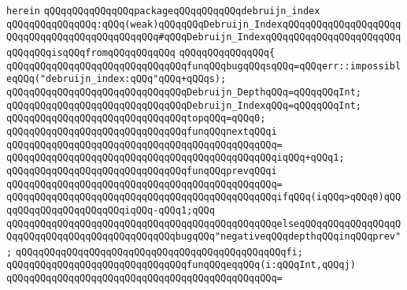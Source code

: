 \verb|herein|\newline
\newline
\verb|qQQqqQQqqQQqqQQqpackageqQQqqQQqqQQqdebruijn_index|\newline
\verb|qQQqqQQqqQQqqQQq:qQQq(weak)qQQqqQQqDebruijn_IndexqQQqqQQqqQQqqQQqqQQqqQQqqQQqqQQqqQQqqQQqqQQqqQQq#qQQqDebruijn_IndexqQQqqQQqqQQqqQQqqQQqqQQqqQQqqQQqisqQQqfromqQQqqQQqqQQq|\newline
\verb|qQQqqQQqqQQqqQQq{|\newline
\newline
\verb|qQQqqQQqqQQqqQQqqQQqqQQqqQQqqQQqfunqQQqbugqQQqsqQQq=qQQqerr::impossibleqQQq("debruijn_index:qQQq"qQQq+qQQqs);|\newline
\newline
\verb|qQQqqQQqqQQqqQQqqQQqqQQqqQQqqQQqDebruijn_DepthqQQq=qQQqqQQqInt;|\newline
\verb|qQQqqQQqqQQqqQQqqQQqqQQqqQQqqQQqDebruijn_IndexqQQq=qQQqqQQqInt;|\newline
\newline
\verb|qQQqqQQqqQQqqQQqqQQqqQQqqQQqqQQqtopqQQq=qQQq0;|\newline
\newline
\verb|qQQqqQQqqQQqqQQqqQQqqQQqqQQqqQQqfunqQQqnextqQQqi|\newline
\verb|qQQqqQQqqQQqqQQqqQQqqQQqqQQqqQQqqQQqqQQqqQQqqQQq=|\newline
\verb|qQQqqQQqqQQqqQQqqQQqqQQqqQQqqQQqqQQqqQQqqQQqqQQqiqQQq+qQQq1;|\newline
\newline
\verb|qQQqqQQqqQQqqQQqqQQqqQQqqQQqqQQqfunqQQqprevqQQqi|\newline
\verb|qQQqqQQqqQQqqQQqqQQqqQQqqQQqqQQqqQQqqQQqqQQqqQQq=|\newline
\verb|qQQqqQQqqQQqqQQqqQQqqQQqqQQqqQQqqQQqqQQqqQQqqQQqifqQQq(iqQQq>qQQq0)qQQqqQQqqQQqqQQqqQQqqQQqiqQQq-qQQq1;qQQq|\newline
\verb|qQQqqQQqqQQqqQQqqQQqqQQqqQQqqQQqqQQqqQQqqQQqqQQqelseqQQqqQQqqQQqqQQqqQQqqQQqqQQqqQQqqQQqqQQqqQQqqQQqbugqQQq"negativeqQQqdepthqQQqinqQQqprev";|\newline
\verb|qQQqqQQqqQQqqQQqqQQqqQQqqQQqqQQqqQQqqQQqqQQqqQQqfi;|\newline
\newline
\verb|qQQqqQQqqQQqqQQqqQQqqQQqqQQqqQQqfunqQQqeqqQQq(i:qQQqInt,qQQqj)|\newline
\verb|qQQqqQQqqQQqqQQqqQQqqQQqqQQqqQQqqQQqqQQqqQQqqQQq=|\newline
